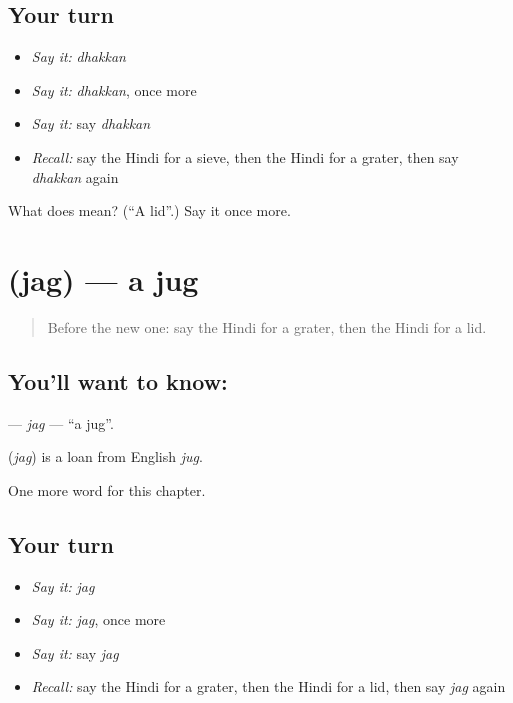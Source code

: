 \subsection*{Your turn}
\begin{itemize}
\raggedright
  \item \emph{Say it:} \emph{dhakkan}
  \item \emph{Say it:} \emph{dhakkan}, once more
  \item \emph{Say it:} say \emph{dhakkan}
  \item \emph{Recall:} say the Hindi for a sieve, then the Hindi for a grater, then say \emph{dhakkan} again
\end{itemize}

\begin{tcolorbox}[breakable,colback=teal!4,colframe=teal!35!black,title={Before you move on}]
What does  mean? (\textquotedblleft{}A lid\textquotedblright{}.) Say it once more.
\end{tcolorbox}
\section[\texorpdfstring{\hi{जग} (jag)}{जग (jag)}]{ (jag) — a jug}

\label{lesson:HI-C270-jag}



\begin{quote}
Before the new one: say the Hindi for a grater, then the Hindi for a lid.
\end{quote}

\subsection*{You'll want to know: }
\textbf{} — \emph{jag} — \textquotedblleft{}a jug\textquotedblright{}.

\begin{cousinweb}
\textbf{} (\emph{jag}) is a loan from English \emph{jug}.
\end{cousinweb}

\begin{grammarlens}[title={What you've built}]
One more word for this chapter.
\end{grammarlens}

\subsection*{Your turn}
\begin{itemize}
\raggedright
  \item \emph{Say it:} \emph{jag}
  \item \emph{Say it:} \emph{jag}, once more
  \item \emph{Say it:} say \emph{jag}
  \item \emph{Recall:} say the Hindi for a grater, then the Hindi for a lid, then say \emph{jag} again
\end{itemize}

